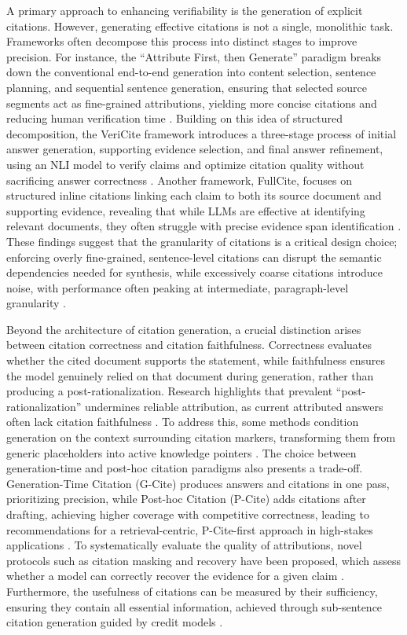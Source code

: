 \documentclass[11pt]{article}
\begin{document}
A primary approach to enhancing verifiability is the generation of explicit citations. However, generating effective citations is not a single, monolithic task. Frameworks often decompose this process into distinct stages to improve precision. For instance, the ``Attribute First, then Generate'' paradigm breaks down the conventional end-to-end generation into content selection, sentence planning, and sequential sentence generation, ensuring that selected source segments act as fine-grained attributions, yielding more concise citations and reducing human verification time \cite{ref192}. Building on this idea of structured decomposition, the VeriCite framework introduces a three-stage process of initial answer generation, supporting evidence selection, and final answer refinement, using an NLI model to verify claims and optimize citation quality without sacrificing answer correctness \cite{ref193}. Another framework, FullCite, focuses on structured inline citations linking each claim to both its source document and supporting evidence, revealing that while LLMs are effective at identifying relevant documents, they often struggle with precise evidence span identification \cite{ref194}. These findings suggest that the granularity of citations is a critical design choice; enforcing overly fine-grained, sentence-level citations can disrupt the semantic dependencies needed for synthesis, while excessively coarse citations introduce noise, with performance often peaking at intermediate, paragraph-level granularity \cite{ref195}.

Beyond the architecture of citation generation, a crucial distinction arises between citation correctness and citation faithfulness. Correctness evaluates whether the cited document supports the statement, while faithfulness ensures the model genuinely relied on that document during generation, rather than producing a post-rationalization. Research highlights that prevalent ``post-rationalization'' undermines reliable attribution, as current attributed answers often lack citation faithfulness \cite{ref196}. To address this, some methods condition generation on the context surrounding citation markers, transforming them from generic placeholders into active knowledge pointers \cite{ref197}. The choice between generation-time and post-hoc citation paradigms also presents a trade-off. Generation-Time Citation (G-Cite) produces answers and citations in one pass, prioritizing precision, while Post-hoc Citation (P-Cite) adds citations after drafting, achieving higher coverage with competitive correctness, leading to recommendations for a retrieval-centric, P-Cite-first approach in high-stakes applications \cite{ref198}. To systematically evaluate the quality of attributions, novel protocols such as citation masking and recovery have been proposed, which assess whether a model can correctly recover the evidence for a given claim \cite{ref199}. Furthermore, the usefulness of citations can be measured by their sufficiency, ensuring they contain all essential information, achieved through sub-sentence citation generation guided by credit models \cite{ref200}.
\end{document}
